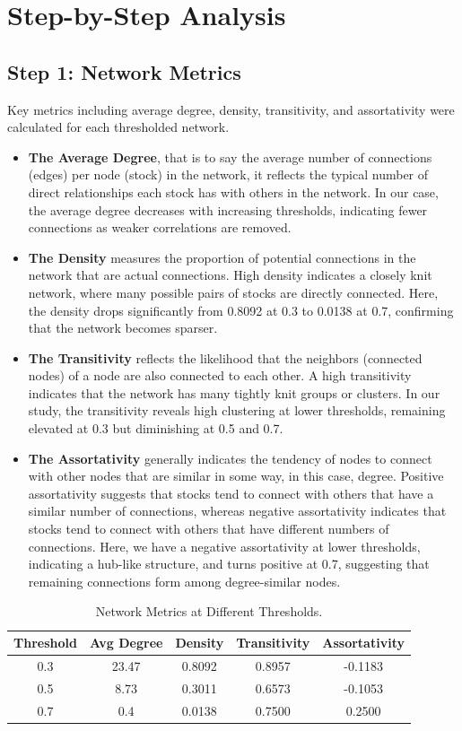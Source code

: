 \documentclass[12pt]{article}
\begin{document}
\section{Step-by-Step Analysis}

\subsection{Step 1: Network Metrics}
Key metrics including average degree, density, transitivity, and assortativity were calculated for each thresholded network.

\begin{itemize}
    \item \textbf{The Average Degree}, that is to say the average number of connections (edges) per node (stock) in the network, it reflects the typical number of direct relationships each stock has with others in the network. In our case, the average degree decreases with increasing thresholds, indicating fewer connections as weaker correlations are removed.
    \item \textbf{The Density} measures the proportion of potential connections in the network that are actual connections. High density indicates a closely knit network, where many possible pairs of stocks are directly connected.  Here, the density drops significantly from 0.8092 at 0.3 to 0.0138 at 0.7, confirming that the network becomes sparser.
    \item \textbf{The Transitivity} reflects the likelihood that the neighbors (connected nodes) of a node are also connected to each other. A high transitivity indicates that the network has many tightly knit groups or clusters. In our study, the transitivity reveals high clustering at lower thresholds, remaining elevated at 0.3 but diminishing at 0.5 and 0.7.
    \item \textbf{The Assortativity} generally indicates the tendency of nodes to connect with other nodes that are similar in some way, in this case, degree. Positive assortativity suggests that stocks tend to connect with others that have a similar number of connections, whereas negative assortativity indicates that stocks tend to connect with others that have different numbers of connections. Here, we have a negative assortativity at lower thresholds, indicating a hub-like structure, and turns positive at 0.7, suggesting that remaining connections form among degree-similar nodes.
\end{itemize}

\begin{table}[H]
    \centering
    \begin{tabular}{|c|c|c|c|c|}
        \hline
        Threshold & Avg Degree & Density & Transitivity & Assortativity \\
        \hline
        0.3 & 23.47 & 0.8092 & 0.8957 & -0.1183 \\
        0.5 & 8.73 & 0.3011 & 0.6573 & -0.1053 \\
        0.7 & 0.4 & 0.0138 & 0.7500 & 0.2500 \\
        \hline
    \end{tabular}
    \caption{Network Metrics at Different Thresholds.}
\end{table}
\end{document}
